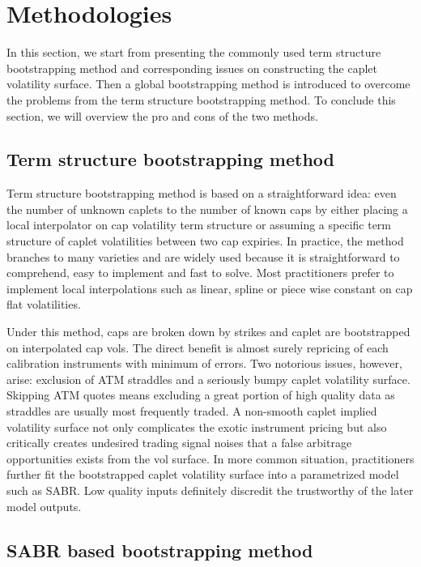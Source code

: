 \documentclass{article}
\begin{document}
\section{Methodologies}

In this section, we start from presenting the commonly used term structure bootstrapping method and corresponding issues on constructing the caplet volatility surface.
Then a global bootstrapping method is introduced to overcome the problems from the term structure bootstrapping method.
To conclude this section, we will overview the pro and cons of the two methods.

\subsection{Term structure bootstrapping method}

Term structure bootstrapping method is based on a straightforward idea: even the number of unknown caplets to the number of known caps by either placing a local interpolator on cap volatility term structure or assuming a specific term structure of caplet volatilities between two cap expiries.
In practice, the method branches to many varieties and are widely used because it is straightforward to comprehend, easy to implement and fast to solve.
Most practitioners prefer to implement local interpolations such as linear, spline or piece wise constant on cap flat volatilities.

Under this method, caps are broken down by strikes and caplet are bootstrapped on interpolated cap vols.
The direct benefit is almost surely repricing of each calibration instruments with minimum of errors.
Two notorious issues, however, arise: exclusion of ATM straddles and a seriously bumpy caplet volatility surface.
Skipping ATM quotes means excluding a great portion of high quality data as straddles are usually most frequently traded.
A non-smooth caplet implied volatility surface not only complicates the exotic instrument pricing but also critically creates undesired trading signal noises that a false arbitrage opportunities exists from the vol surface.
In more common situation, practitioners further fit the bootstrapped caplet volatility surface into a parametrized model such as SABR.
Low quality inputs definitely discredit the trustworthy of the later model outputs.

\subsection{SABR based bootstrapping method}
\end{document}
